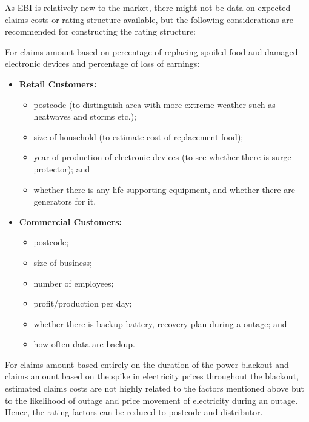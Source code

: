 \documentclass[12pt]{article}
\begin{document}
\begin{flushleft}
As EBI is relatively new to the market, there might not be data on expected claims costs or rating structure available, but the following considerations are recommended for constructing the rating structure:\par
For claims amount based on percentage of replacing spoiled food and damaged electronic devices and percentage of loss of earnings: \par
\begin{itemize}
    \item {\textbf{Retail Customers:}}
    \begin{itemize}
        \item postcode (to distinguish area with more extreme weather such as heatwaves and storms etc.); 
        \item size of household (to estimate cost of replacement food);
        \item year of production of electronic devices (to see whether there is surge protector); and
        \item whether there is any life-supporting equipment, and whether there are generators for it. 
    \end{itemize}
    \item {\textbf{Commercial Customers:}}
        \begin{itemize}
        \item postcode; 
        \item size of business; 
        \item number of employees;
        \item profit/production per day;
        \item whether there is backup battery, recovery plan during a outage; and
        \item how often data are backup.
    \end{itemize}
\end{itemize}
For claims amount based entirely on the duration of the power blackout and claims amount based on the spike in electricity prices throughout the blackout, estimated claims costs are not highly related to the factors mentioned above but to the likelihood of outage and price movement of electricity during an outage. Hence, the rating factors can be reduced to postcode and distributor.\par
\end{flushleft}
\end{document}
